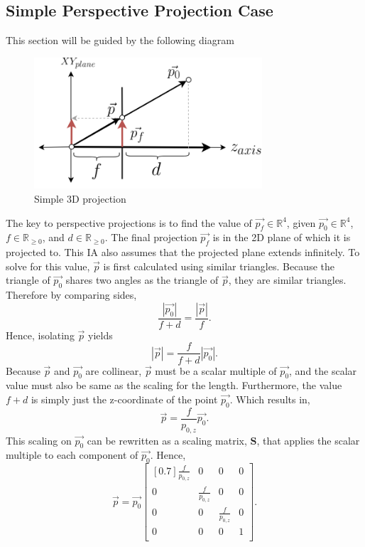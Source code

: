 \documentclass[12pt, letterpaper]{article}
\begin{document}
\subsection{Simple Perspective Projection Case}
This section will be guided by the following diagram
\begin{figure}[H]
\centering
\includegraphics[width=8.5cm]{simple_3D.png}
\caption{Simple 3D projection}
\label{fig:figure}
\end{figure} 
The key to perspective projections is to find the value of $\vec{p_f} \in \mathbb{R}^4$, given $\vec{p_0}\in \mathbb{R}^4$, $f \in \mathbb{R}_{\geq0}$, and $d \in \mathbb{R}_{\geq0}$. The final projection $\vec{p_f}$ is in the 2D plane of which it is projected to. This IA also assumes that the projected plane extends infinitely. To solve for this value, $\vec{p}$ is first calculated using similar triangles. Because the triangle of $\vec{p_0}$ shares two angles as the triangle of $\vec{p}$, they are similar triangles. Therefore by comparing sides, 
$$\frac{|\vec{p_0}|}{f+d} = \frac{|\vec{p}|}{f}.$$
Hence, isolating $\vec{p}$ yields
$$|\vec{p}| = \frac{f}{f+d}|\vec{p_0}|.$$
Because $\vec{p}$ and $\vec{p_0}$ are collinear, $\vec{p}$ must be a scalar multiple of $\vec{p_0}$, and the scalar value must also be same as the scaling for the length. Furthermore, the value $f+d$ is simply just the z-coordinate of the point $\vec{p_0}$. Which results in,
\begin{equation}
    \vec{p} = \frac{f}{p_{0, z}}\vec{p_0}.
\end{equation}
This scaling on $\vec{p_0}$ can be rewritten as a scaling matrix, $\mathbf{S}$, that applies the scalar multiple to each component of $\vec{p_0}$. Hence, 
$$\vec{p} = \vec{p_0} \begin{bmatrix}[0.7] \frac{f}{p_{0,z}} & 0 & 0 & 0\\ 0 & \frac{f}{p_{0, z}} & 0 & 0 \\ 0 & 0 & \frac{f}{p_{0, z}} & 0 \\ 0 & 0 & 0 & 1\\   \end{bmatrix}.$$
\end{document}
